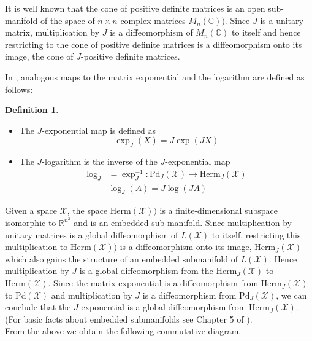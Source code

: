 \documentclass{amsart}
\numberwithin{equation}{section}
\theoremstyle{definition}
\newtheorem{definition}[theorem]{Definition}
\theoremstyle{plain}
\theoremstyle{solutionstyle}
\begin{document}
It is well known that the cone of positive definite matrices is an open sub-manifold of the space of $n\times n$ complex matrices $M_n(\mathbb{C}))$. Since $J$ is a unitary matrix, multiplication by $J$ is a diffeomorphism of $M_n(\mathbb{C})$ to itself and hence restricting to the cone of positive definite matrices is a diffeomorphism onto its image, the cone of $J$-positive definite matrices.

In \cite{franco2026conejhermitianmatricesgeometric}, analogous maps to the matrix exponential and the logarithm are defined as follows:
\begin{definition}\cite{franco2026conejhermitianmatricesgeometric}
\begin{itemize}Let $\mathcal{X}$ be a complex Euclidean space and $J$ a Krein matrix.
   \item The $J$-exponential map is defined as 
    \begin{equation*}\exp_J(X)=J\exp(JX)\end{equation*} 
    \item The $J$-logarithm is the inverse of the $J$-exponential map 
    \begin{align*}\log_J&=\exp_J^{-1}:\mathrm{Pd}_J(\mathcal{X})\to \mathrm{Herm}_J(\mathcal{X})\\
    &\log_J(A)=J\log(JA)
    \end{align*}
\end{itemize}
\end{definition}

Given a space $\mathcal{X}$, the space $\mathrm{Herm}(\mathcal{X}))$ is a finite-dimensional subspace isomorphic to $\mathbb{R}^{n^2}$ and is an embedded sub-manifold. Since multiplication by unitary matrices is a global diffeomorphism of $L(\mathcal{X})$ to itself, restricting this multiplication to $\mathrm{Herm}(\mathcal{X}))$ is a diffeomorphism onto its image, $\mathrm{Herm}_J(\mathcal{X})$ which also gains the structure of an embedded submanifold of $L(\mathcal{X})$. Hence multiplication by $J$ is a global diffeomorphism from the $\mathrm{Herm}_J(\mathcal{X})$ to $\mathrm{Herm}(\mathcal{X})$. Since the matrix exponential is a diffeomorphism from $\mathrm{Herm}_J(\mathcal{X})$ to $\mathrm{Pd}(\mathcal{X})$ and multiplication by $J$ is a diffeomorphism from $\mathrm{Pd}_J(\mathcal{X})$, we can conclude that the $J$-exponential is a global diffeomorphism from $\mathrm{Herm}_{J}(\mathcal{X})$. (For basic facts about embedded submanifolds see Chapter 5 of \cite{lee_introduction_2012}).\\
From the above we obtain the following commutative diagram.
\end{document}
